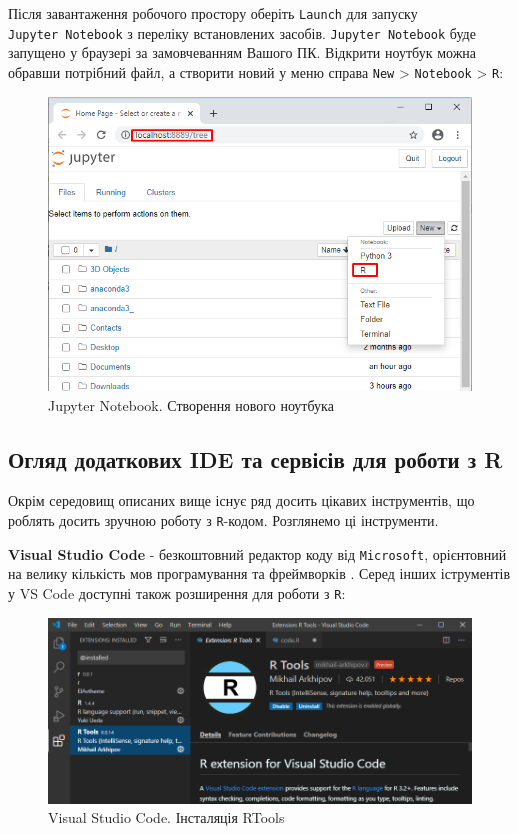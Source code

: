 \documentclass[
]{book}
\begin{document}
Після завантаження робочого простору оберіть \texttt{Launch} для запуску \texttt{Jupyter\ Notebook} з переліку встановлених засобів. \texttt{Jupyter\ Notebook} буде запущено у браузері за замовчеванням Вашого ПК. Відкрити ноутбук можна обравши потрібний файл, а створити новий у меню справа \texttt{New} \textgreater{} \texttt{Notebook} \textgreater{} \texttt{R}:

\begin{figure}
\centering
\includegraphics{images/chapter1/anaconda_6.png}
\caption{\label{fig:unnamed-chunk-27}Jupyter Notebook. Створення нового ноутбука}
\end{figure}

\hypertarget{chapter134}{%
\subsection{Огляд додаткових IDE та сервісів для роботи з R}\label{chapter134}}

Окрім середовищ описаних вище існує ряд досить цікавих інструментів, що роблять досить зручною роботу з \texttt{R}-кодом. Розглянемо ці інструменти.

\textbf{Visual Studio Code} - безкоштовний редактор коду від \texttt{Microsoft}, орієнтовний на велику кількість мов програмування та фреймворків \citep{vs-code}. Серед інших іструментів у VS Code доступні також розширення для роботи з \texttt{R}:

\begin{figure}
\centering
\includegraphics{images/chapter1/vs_code.png}
\caption{\label{fig:unnamed-chunk-28}Visual Studio Code. Інсталяція RTools}
\end{figure}
\end{document}
